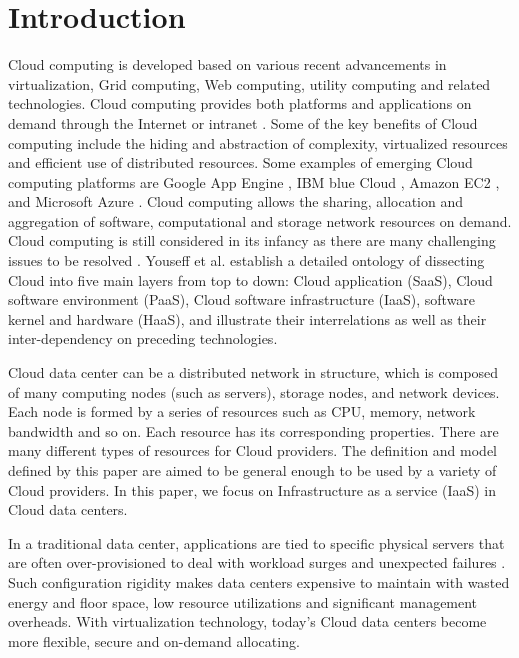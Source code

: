 \documentclass[3p, twocolumn]{elsarticle}
\begin{document}
\section{Introduction}
Cloud computing is developed based on various recent advancements in virtualization, Grid computing, Web computing, utility computing and related technologies. Cloud computing provides both platforms and applications on demand through the Internet or intranet \cite{IEEEhowto:Armbrust}. Some of the key benefits of Cloud computing include the hiding and abstraction of complexity, virtualized resources and efficient use of distributed resources. Some examples of emerging Cloud computing platforms are Google App Engine \cite{IEEEhowto:Google}, IBM blue Cloud \cite{IEEEhowto:IBM}, Amazon EC2 \cite{IEEEhowto:Amazon}, and Microsoft Azure \cite{IEEEhowto:Microsoft}. Cloud computing allows the sharing, allocation and aggregation of software, computational and storage network resources on demand. Cloud computing is still considered in its infancy as there are many challenging issues to be resolved \cite{IEEEhowto:Armbrust}\cite{IEEEhowto:Beloglazov}\cite{IEEEhowto:Buyya2}. Youseff et al. \cite{IEEEhowto:Youseff} establish a detailed ontology of dissecting Cloud into five main layers from top to down: Cloud application (SaaS), Cloud software environment (PaaS), Cloud software infrastructure (IaaS), software kernel and hardware (HaaS), and illustrate their interrelations as well as their inter-dependency on preceding technologies.

Cloud data center can be a distributed network in structure, which is composed of many computing nodes (such as servers), storage nodes, and network devices. Each node is formed by a series of resources such as CPU, memory, network bandwidth and so on. Each resource has its corresponding properties. There are many different types of resources for Cloud providers. The definition and model defined by this paper are aimed to be general enough to be used by a variety of Cloud providers. In this paper, we focus on Infrastructure as a service (IaaS) in Cloud data centers.

In a traditional data center, applications are tied to specific physical servers that are often over-provisioned to deal with workload surges and unexpected failures \cite{IEEEhowto:Singh}. Such configuration rigidity makes data centers expensive to maintain
with wasted energy and floor space, low resource utilizations and significant management overheads.
With virtualization technology, today's Cloud data centers become more flexible, secure and on-demand allocating. 
\end{document}
